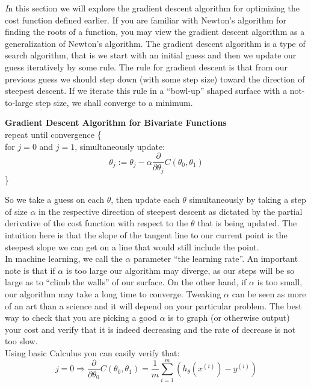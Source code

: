 \documentclass[11pt,a4paper,oneside]{report}
\begin{document}
{\it\huge I}n this section we will explore the gradient descent algorithm for optimizing the cost function defined earlier. If you are familiar with Newton's algorithm for finding the roots of a function, you may view the gradient descent algorithm as a generalization of Newton's algorithm. The gradient descent algorithm is a type of search algorithm, that is we start with an initial guess and then we update our guess iteratively by some rule. The rule for gradient descent is that from our previous guess we should step down (with some step size) toward the direction of steepest descent. If we iterate this rule in a ``bowl-up'' shaped surface with a not-to-large step size, we shall converge to a minimum.

\begin{framed}
{\bf Gradient Descent Algorithm for Bivariate Functions}\\

\noindent repeat until convergence \{\\
\indent for $j = 0$ and $j = 1$, simultaneously update:
\[
\theta_j := \theta_j - \alpha \frac{\partial}{\partial \theta_j} C(\theta_0,\theta_1)
\]
\}

\end{framed}
So we take a guess on each $\theta$, then update each $\theta$ simultaneously by taking a step of size $\alpha$ in the respective direction of steepest descent as dictated by the partial derivative of the cost function with respect to the $\theta$ that is being updated. The intuition here is that the slope of the tangent line to our current point is the steepest slope we can get on a line that would still include the point.\\

In machine learning, we call the $\alpha$ parameter ``the learning rate''. An important note is that if $\alpha$ is too large our algorithm may diverge, as our steps will be so large as to ``climb the walls'' of our surface. On the other hand, if $\alpha$ is too small, our algorithm may take a long time to converge. Tweaking $\alpha$ can be seen as more of an art than a science and it will depend on your particular problem. The best way to check that you are picking a good $\alpha$ is to graph (or otherwise output) your cost and verify that it is indeed decreasing and the rate of decrease is not too slow.\\

Using basic Calculus you can easily verify that:
\[
j = 0 \Rightarrow \frac{\partial}{\partial \theta_0}C(\theta_0,\theta_1) = \frac{1}{m}\sum\limits_{i=1}^m(h_{\theta}(x^{(i)})-y^{(i)})
\]
\end{document}
